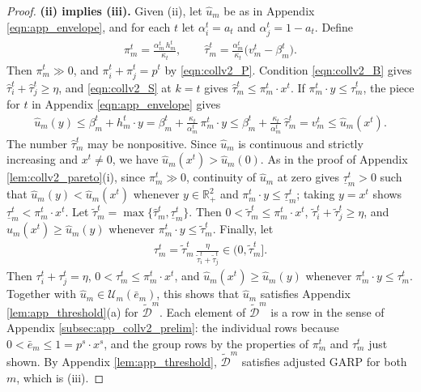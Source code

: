 \documentclass[11 pt]{article}
\begin{document}
\begin{proof}
\textbf{(ii) implies (iii).} Given (ii), let $\widehat u_{m}$ be as in Appendix \autoref{eqn:app_envelope}, and for each $t$ let $\alpha_{i}^{t} = a_{t}$ and $\alpha_{j}^{t} = 1 - a_{t}$. Define
\begin{align*}
\pi_{m}^{t} = \frac{\alpha_{m}^{t}\, h_{m}^{t}}{\kappa_{t}}, \qquad
\hat \tau_{m}^{t} = \frac{\alpha_{m}^{t}}{\kappa_{t}} \bigl( v_{m}^{t} - \beta_{m}^{t} \bigr).
\end{align*}
Then $\pi_{m}^{t} \gg 0$, and $\pi_{i}^{t} + \pi_{j}^{t} = p^{t}$ by \eqref{eqn:collv2_P}. Condition \eqref{eqn:collv2_B} gives $\hat \tau_{i}^{t} + \hat \tau_{j}^{t} \geq \eta$, and \eqref{eqn:collv2_S} at $k = t$ gives $\hat \tau_{m}^{t} \leq \pi_{m}^{t} \cdot x^{t}$. If $\pi_{m}^{t} \cdot y \leq \hat \tau_{m}^{t}$, the piece for $t$ in Appendix \autoref{eqn:app_envelope} gives
\begin{align*}
\widehat u_{m}(y) \leq \beta_{m}^{t} + h_{m}^{t} \cdot y = \beta_{m}^{t} + \frac{\kappa_{t}}{\alpha_{m}^{t}}\, \pi_{m}^{t} \cdot y \leq \beta_{m}^{t} + \frac{\kappa_{t}}{\alpha_{m}^{t}}\, \hat \tau_{m}^{t} = v_{m}^{t} \leq \widehat u_{m}(x^{t}).
\end{align*}
The number $\hat \tau_{m}^{t}$ may be nonpositive. Since $\widehat u_{m}$ is continuous and strictly increasing and $x^{t} \neq 0$, we have $\widehat u_{m}(x^{t}) > \widehat u_{m}(0)$. As in the proof of Appendix \autoref{lem:collv2_pareto}(i), since $\pi_{m}^{t} \gg 0$, continuity of $\widehat u_{m}$ at zero gives $\underline{\tau}_{m}^{t} > 0$ such that $\widehat u_{m}(y) < \widehat u_{m}(x^{t})$ whenever $y \in \mathbb{R}^{2}_{+}$ and $\pi_{m}^{t} \cdot y \leq \underline{\tau}_{m}^{t}$; taking $y = x^{t}$ shows $\underline{\tau}_{m}^{t} < \pi_{m}^{t} \cdot x^{t}$. Let $\tilde \tau_{m}^{t} = \max \{ \hat \tau_{m}^{t}, \underline{\tau}_{m}^{t} \}$. Then $0 < \tilde \tau_{m}^{t} \leq \pi_{m}^{t} \cdot x^{t}$, $\tilde \tau_{i}^{t} + \tilde \tau_{j}^{t} \geq \eta$, and $\widehat u_{m}(x^{t}) \geq \widehat u_{m}(y)$ whenever $\pi_{m}^{t} \cdot y \leq \tilde \tau_{m}^{t}$. Finally, let
\begin{align*}
\tau_{m}^{t} = \tilde \tau_{m}^{t}\, \frac{\eta}{\tilde \tau_{i}^{t} + \tilde \tau_{j}^{t}} \in \bigl( 0, \tilde \tau_{m}^{t} \bigr].
\end{align*}
Then $\tau_{i}^{t} + \tau_{j}^{t} = \eta$, $0 < \tau_{m}^{t} \leq \pi_{m}^{t} \cdot x^{t}$, and $\widehat u_{m}(x^{t}) \geq \widehat u_{m}(y)$ whenever $\pi_{m}^{t} \cdot y \leq \tau_{m}^{t}$. Together with $\widehat u_{m} \in \mathcal{U}_{m}(\bar e_{m})$, this shows that $\widehat u_{m}$ satisfies Appendix \autoref{lem:app_threshold}(a) for $\widetilde{\mathcal{D}}^{m}$. Each element of $\widetilde{\mathcal{D}}^{m}$ is a row in the sense of Appendix \autoref{subsec:app_collv2_prelim}: the individual rows because $0 < \bar e_{m} \leq 1 = p^{s} \cdot x^{s}$, and the group rows by the properties of $\pi_{m}^{t}$ and $\tau_{m}^{t}$ just shown. By Appendix \autoref{lem:app_threshold}, $\widetilde{\mathcal{D}}^{m}$ satisfies adjusted GARP for both $m$, which is (iii).


\end{proof}
\end{document}
